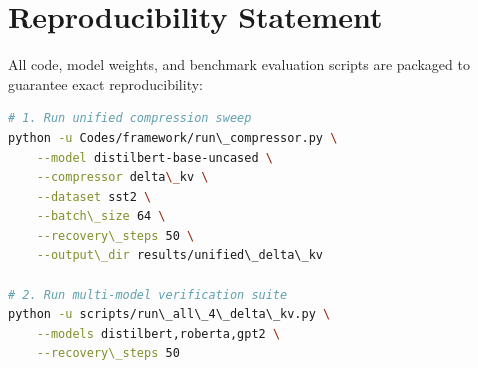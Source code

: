\section{Reproducibility Statement}
All code, model weights, and benchmark evaluation scripts are packaged to guarantee exact reproducibility:
\begin{lstlisting}[language=bash]
# 1. Run unified compression sweep
python -u Codes/framework/run\_compressor.py \
    --model distilbert-base-uncased \
    --compressor delta\_kv \
    --dataset sst2 \
    --batch\_size 64 \
    --recovery\_steps 50 \
    --output\_dir results/unified\_delta\_kv

# 2. Run multi-model verification suite
python -u scripts/run\_all\_4\_delta\_kv.py \
    --models distilbert,roberta,gpt2 \
    --recovery\_steps 50
\end{lstlisting}
